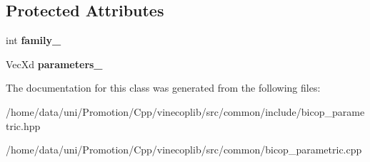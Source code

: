 \subsection*{Protected Attributes}
\begin{DoxyCompactItemize}
\item 
\hypertarget{class_par_bicop_aad4552dd9bdb238917be5171c6ee4760}{int {\bfseries family\+\_\+}}\label{class_par_bicop_aad4552dd9bdb238917be5171c6ee4760}

\item 
\hypertarget{class_par_bicop_a9c15250d48f5260c70fd6de6b7502744}{Vec\+Xd {\bfseries parameters\+\_\+}}\label{class_par_bicop_a9c15250d48f5260c70fd6de6b7502744}

\end{DoxyCompactItemize}


The documentation for this class was generated from the following files\+:\begin{DoxyCompactItemize}
\item 
/home/data/uni/\+Promotion/\+Cpp/vinecoplib/src/common/include/bicop\+\_\+parametric.\+hpp\item 
/home/data/uni/\+Promotion/\+Cpp/vinecoplib/src/common/bicop\+\_\+parametric.\+cpp\end{DoxyCompactItemize}
